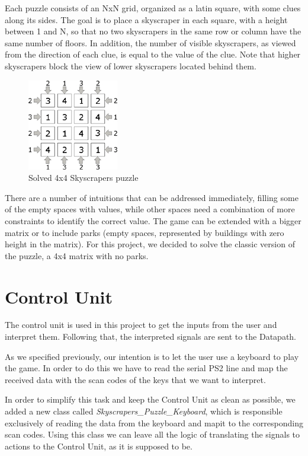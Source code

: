 \documentclass[12pt]{report}
\begin{document}
Each puzzle consists of an NxN grid, organized as a latin square, with some
clues along its sides. The goal is to place a skyscraper in each square,
with a height between 1 and N, so that no two skyscrapers in the same row
or column have the same number of floors. In addition, the number of visible
skyscrapers, as viewed from the direction of each clue, is equal to the value
of the clue. Note that higher skyscrapers block the view of lower skyscrapers
located behind them.

\begin{figure}[H]
  \centering
  \includegraphics[keepaspectratio]{images/skyscrapers_small_solved.jpg}
  \caption{Solved 4x4 Skyscrapers puzzle}
\end{figure}

There are a number of intuitions that can be addressed immediately,
filling some of the empty spaces with values, while other spaces need
a combination of more constraints to identify the correct value. The game
can be extended with a bigger matrix or to include parks (empty spaces,
represented by buildings with zero height in the matrix). For this project, we
decided to solve the classic version of the puzzle, a 4x4 matrix with no parks.

\newpage

\section*{Control Unit}

The control unit is used in this project to get the inputs from the user
and interpret them. Following that, the interpreted signals are sent to
the Datapath.

As we specified previously, our intention is to let the user use
a keyboard to play the game. In order to do this we have to read the
serial PS2 line and map the received data with the scan codes of the
keys that we want to interpret.

In order to simplify this task and keep the Control Unit as clean as possible,
we added a new class called \textit{Skyscrapers\_Puzzle\_Keyboard}, which
is responsible exclusively of reading the data from the keyboard and mapit
to the corresponding scan codes. Using this class we can leave all the
logic of translating the signals to actions to the Control Unit, as it is
supposed to be.
\end{document}
